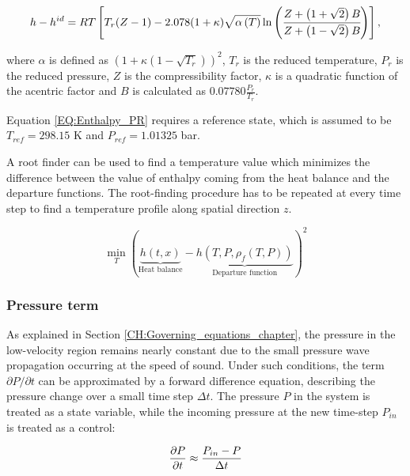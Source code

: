 \documentclass[a4paper,fleqn]{cas-dc}
\begin{document}
	{\scriptsize
		\begin{equation}
			{\color{black}h}-{\color{black}h}^{id}={\color{black}R}T \left[{\color{black}T_r}({\color{black}Z}-1) -2.078(1+{\color{black}\kappa} ){\sqrt { {\color{black}\alpha}\left(T\right) } } \ln \left(\cfrac{{\color{black}Z}+\left( 1+\sqrt{2} \right){\color{black}B}}{{\color{black}Z}+\left( 1-\sqrt{2} \right){\color{black}B}}\right)\right],
			\label{EQ:Enthalpy_PR}
		\end{equation}				
	}
	
	where $\alpha$ is defined as $\left( 1+\kappa \left( 1 - \sqrt{T_r} \right) \right)^2$, $T_r$ is the reduced temperature, $P_r$ is the reduced pressure, $Z$ is the compressibility factor, $\kappa$ is a quadratic function of the acentric factor and $B$ is calculated as $0.07780\frac{P_r}{T_r}$.
	
	Equation \ref{EQ:Enthalpy_PR} requires a reference state, which is assumed to be $T_{ref}=298.15$ K and $P_{ref}=1.01325$ bar.
	
	A root finder can be used to find a temperature value which minimizes the difference between the value of enthalpy coming from the heat balance and the departure functions. The root-finding procedure has to be repeated at every time step to find a temperature profile along spatial direction $z$.
	
	{\footnotesize
		\begin{equation}
			\min_T \left( \underbrace{h\left(t,x\right)}_{\text{Heat balance}} - \underbrace{h\left(T,P,\rho_f\left(T,P\right)\right)}_{\text{Departure function}} \right)^2
			\label{EQ:Enthalpy_root}
		\end{equation}
	}
	
	\subsubsection{Pressure term} \label{CH: Pressure}
	
	{\color{blue}As explained in Section \ref{CH:Governing_equations_chapter}, the pressure in the low-velocity region remains nearly constant due to the small pressure wave propagation occurring at the speed of sound. Under such conditions, the term $\partial P/\partial t$ can be approximated by a forward difference equation, describing the pressure change over a small time step $\Delta t$. The pressure $P$ in the system is treated as a state variable, while the incoming pressure at the new time-step $P_{in}$ is treated as a control:}
	
	{\footnotesize
		\begin{equation}
			\frac{\partial {\color{black}P}}{\partial t} \approx \frac{{\color{black}P_{in}} - {\color{black}P} }{\Delta t}
	\end{equation}}
	
\end{document}
